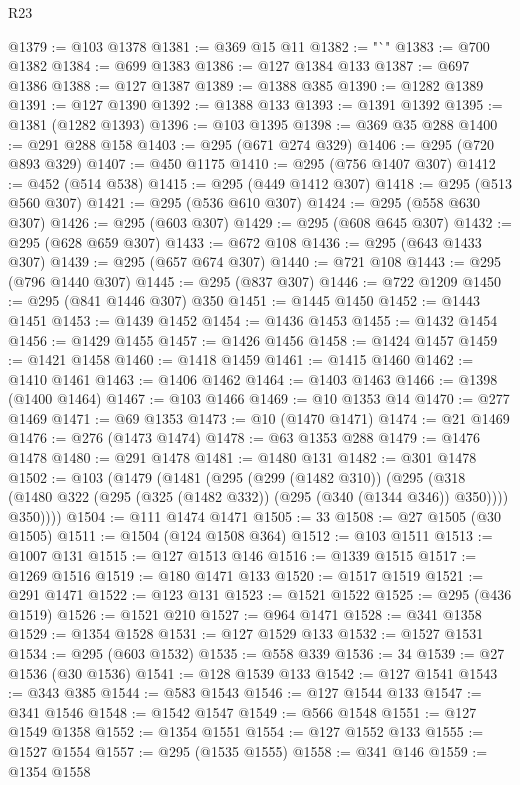 \begin{lexlean}{R23}
\begin{coremodule}
@1379 := @103 @1378
@1381 := @369 @15 @11
@1382 := "`"
@1383 := @700 @1382
@1384 := @699 @1383
@1386 := @127 @1384 @133
@1387 := @697 @1386
@1388 := @127 @1387
@1389 := @1388 @385
@1390 := @1282 @1389
@1391 := @127 @1390
@1392 := @1388 @133
@1393 := @1391 @1392
@1395 := @1381 (@1282 @1393)
@1396 := @103 @1395
@1398 := @369 @35 @288
@1400 := @291 @288 @158
@1403 := @295 (@671 @274 @329)
@1406 := @295 (@720 @893 @329)
@1407 := @450 @1175
@1410 := @295 (@756 @1407 @307)
@1412 := @452 (@514 @538)
@1415 := @295 (@449 @1412 @307)
@1418 := @295 (@513 @560 @307)
@1421 := @295 (@536 @610 @307)
@1424 := @295 (@558 @630 @307)
@1426 := @295 (@603 @307)
@1429 := @295 (@608 @645 @307)
@1432 := @295 (@628 @659 @307)
@1433 := @672 @108
@1436 := @295 (@643 @1433 @307)
@1439 := @295 (@657 @674 @307)
@1440 := @721 @108
@1443 := @295 (@796 @1440 @307)
@1445 := @295 (@837 @307)
@1446 := @722 @1209
@1450 := @295 (@841 @1446 @307) @350
@1451 := @1445 @1450
@1452 := @1443 @1451
@1453 := @1439 @1452
@1454 := @1436 @1453
@1455 := @1432 @1454
@1456 := @1429 @1455
@1457 := @1426 @1456
@1458 := @1424 @1457
@1459 := @1421 @1458
@1460 := @1418 @1459
@1461 := @1415 @1460
@1462 := @1410 @1461
@1463 := @1406 @1462
@1464 := @1403 @1463
@1466 := @1398 (@1400 @1464)
@1467 := @103 @1466
@1469 := @10 @1353 @14
@1470 := @277 @1469
@1471 := @69 @1353
@1473 := @10 (@1470 @1471)
@1474 := @21 @1469
@1476 := @276 (@1473 @1474)
@1478 := @63 @1353 @288
@1479 := @1476 @1478
@1480 := @291 @1478
@1481 := @1480 @131
@1482 := @301 @1478
@1502 := @103
    (@1479
      (@1481
        (@295
          (@299 (@1482 @310))
          (@295
            (@318 (@1480 @322 (@295 (@325 (@1482 @332)) (@295 (@340 (@1344 @346)) @350))))
            @350))))
@1504 := @111 @1474 @1471
@1505 := 33
@1508 := @27 @1505 (@30 @1505)
@1511 := @1504 (@124 @1508 @364)
@1512 := @103 @1511
@1513 := @1007 @131
@1515 := @127 @1513 @146
@1516 := @1339 @1515
@1517 := @1269 @1516
@1519 := @180 @1471 @133
@1520 := @1517 @1519
@1521 := @291 @1471
@1522 := @123 @131
@1523 := @1521 @1522
@1525 := @295 (@436 @1519)
@1526 := @1521 @210
@1527 := @964 @1471
@1528 := @341 @1358
@1529 := @1354 @1528
@1531 := @127 @1529 @133
@1532 := @1527 @1531
@1534 := @295 (@603 @1532)
@1535 := @558 @339
@1536 := 34
@1539 := @27 @1536 (@30 @1536)
@1541 := @128 @1539 @133
@1542 := @127 @1541
@1543 := @343 @385
@1544 := @583 @1543
@1546 := @127 @1544 @133
@1547 := @341 @1546
@1548 := @1542 @1547
@1549 := @566 @1548
@1551 := @127 @1549 @1358
@1552 := @1354 @1551
@1554 := @127 @1552 @133
@1555 := @1527 @1554
@1557 := @295 (@1535 @1555)
@1558 := @341 @146
@1559 := @1354 @1558

\end{coremodule}
\end{lexlean}
